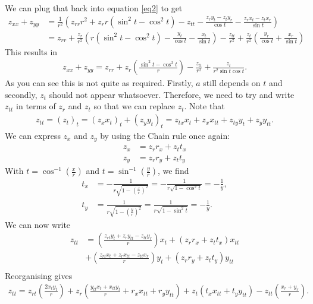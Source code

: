 \documentclass{article}
\begin{document}
We can plug that back into equation \ref{eq2} to get
\begin{align*}
  z_{xx} + z_{yy} &= \frac{1}{r^2}\left(
    z_{rr}r^2+z_r r(\sin^2 t - \cos^2 t) - z_{tt}
    -\frac{z_r y_t -z_t y_r}{\cos t} - \frac{z_r x_t - z_t x_r}{\sin t}
  \right)\\
  &= z_{rr} + \frac{z_r}{r^2}\left(r(\sin^2 t - \cos^2 t) - \frac{y_t}{\cos t} - \frac{x_t}{\sin t}\right)-\frac{z_{tt}}{r^2}
  +\frac{z_t}{r^2}\left(\frac{y_r}{\cos t} + \frac{x_r}{\sin t}\right)
\end{align*}
This results in
\begin{align}
  \label{eq2z}
  z_{xx} + z_{yy}= z_{rr} + z_r\left(\frac{\sin^2 t - \cos^2 t}{r}\right)-\frac{z_{tt}}{r^2}+\frac{z_t}{r^2\sin t\cos t}.
\end{align}
As you can see this is not quite as required. Firstly, $a$ still depends on $t$ and secondly, $z_t$ should not appear whatsoever.
Therefore, we need to try and write $z_{tt}$ in terms of $z_r$ and $z_t$ so that we can replace $z_t$. Note that
\begin{align*}
  z_{tt} = (z_t)_t = (z_x x_t)_t + (z_y y_t)_t = z_{tx}x_t + z_x x_{tt} + z_{ty}y_t + z_y y_{tt}.
\end{align*}
We can express $z_x$ and $z_y$ by using the Chain rule once again:
\begin{align*}
  z_x &= z_r r_x + z_t t_x\\
  z_y &= z_r r_y + z_t t_y
\end{align*}
With $t=\cos^{-1}\left(\frac{x}{r}\right)$ and $t=\sin^{-1}\left(\frac{y}{r}\right)$, we find
\begin{align*}
  t_x &= -\frac{1}{r\sqrt{1-\left(\frac{x}{r}\right)^2}}  = - \frac{1}{r\sqrt{1-\cos^2 t}} = -\frac{1}{y},\\
  t_y &= \frac{1}{r\sqrt{1-\left(\frac{y}{r}\right)^2}}  = \frac{1}{r\sqrt{1-\sin^2 t}} = -\frac{1}{y}.
\end{align*}
We can now write
\begin{align*}
  z_{tt} &=
  \left(\frac{z_{rt}y_t + z_ry_{tt} - z_{tt}y_{r}}{r}\right)x_t + (z_r r_x + z_t t_x)x_{tt}\\
  &+\left(\frac{z_{rt}x_t + z_r x_{tt} - z_{tt}x_r}{r}\right)y_t + (z_r r_y + z_t t_y)y_{tt}\\
\end{align*}
Reorganising gives
\begin{align}
  \label{eqztt}
  z_{tt} =z_{rt}\left(\frac{2 x_t y_t}{r}\right)+z_r\left(\frac{y_{tt}x_t+x_{tt}y_t}{r}+r_x x_{tt}+r_y y_{tt}\right)
  +z_t(t_x x_{tt} + t_y y_{tt})-z_{tt}\left(\frac{x_r+y_r}{r}\right).
\end{align}
\end{document}
